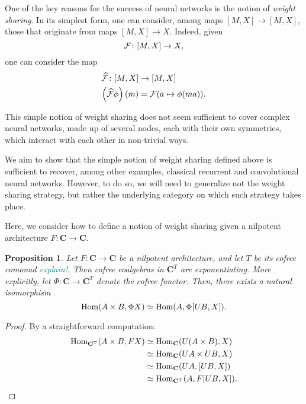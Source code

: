 \documentclass[12pt]{article}
\newtheorem{proposition}{Proposition}
\newcommand{\pietro}[1]{\textcolor{teal}{#1}}
\newcommand{\Hom}{{\textnormal{Hom}}}
\newcommand{\Cat}{{\mathbf{C}}}
\begin{document}
One of the key reasons for the success of neural networks is the notion of {\em weight sharing}. In its simplest form, one can consider, among maps $[M, X] \rightarrow [M, X]$, those that originate from maps $[M, X] \rightarrow X$. Indeed, given
\begin{equation*}
    {\cal F} \colon [M, X] \rightarrow X,
\end{equation*}
one can consider the map
\begin{align*}
    \widehat{\cal F} \colon [M, X]       & \rightarrow [M, X]              \\
    \left(\widehat{\cal F}\phi\right)(m) & = {\cal F}(a \mapsto \phi(ma)).
\end{align*}

This simple notion of weight sharing does not seem sufficient to cover complex neural networks, made up of several nodes, each with their own symmetries, which interact with each other in non-trivial ways.

We aim to show that the simple notion of weight sharing defined above is sufficient to recover, among other examples, classical recurrent and convolutional neural networks. However, to do so, we will need to generalize not the weight sharing strategy, but rather the underlying category on which such strategy takes place.

Here, we consider how to define a notion of weight sharing given a nilpotent architecture $F\colon\Cat \rightarrow \Cat$.

\begin{proposition}\label{prop:cofree_exponentiating}
    Let $F\colon \Cat \rightarrow \Cat$ be a nilpotent architecture, and let $T$ be its cofree comonad \pietro{explain!}. Then cofree coalgebras in $\Cat^T$ are exponentiating. More explicitly, let $\Phi\colon \Cat \rightarrow \Cat^T$ denote the cofree functor. Then, there exists a natural isomorphism
    \begin{equation*}
        \Hom(A\times B, \Phi X) \simeq \Hom(A, \Phi[UB, X]).
    \end{equation*}
\end{proposition}

\begin{proof}
    By a straightforward computation:
    \begin{align*}
        \Hom_{\Cat^T}(A\times B, FX)
         & \simeq \Hom_{\Cat}(U(A \times B), X) \\
         & \simeq \Hom_{\Cat}(UA \times UB, X)  \\
         & \simeq \Hom_{\Cat}(UA, [UB, X])      \\
         & \simeq \Hom_{\Cat^T}(A, F[UB, X]).
    \end{align*}
\end{proof}
\end{document}
